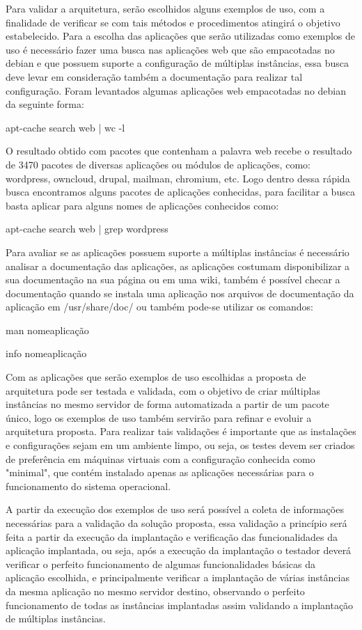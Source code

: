 Para validar a arquitetura, serão escolhidos alguns exemplos de uso, com a
finalidade de verificar se com tais métodos e procedimentos atingirá o objetivo
estabelecido. Para a escolha das aplicações que serão utilizadas como exemplos
de uso é necessário fazer uma busca nas aplicações web que são empacotadas no
debian e que possuem suporte a configuração de múltiplas instâncias, essa busca
deve levar em consideração também a documentação para realizar tal configuração.
Foram levantados algumas aplicações web empacotadas no debian da seguinte forma:

\begin{center}
apt-cache search web | wc -l
\end{center}

O resultado obtido com pacotes que contenham a palavra web recebe o resultado de 3470
pacotes de diversas aplicações ou módulos de aplicações, como:
wordpress, owncloud, drupal, mailman, chromium, etc. Logo dentro dessa rápida busca
encontramos alguns pacotes de aplicações conhecidas, para facilitar a busca basta
aplicar para alguns nomes de aplicações conhecidos como:

\begin{center}
apt-cache search web | grep wordpress
\end{center}

Para avaliar se as aplicações possuem suporte a múltiplas instâncias é necessário
analisar a documentação das aplicações, as aplicações costumam disponibilizar a sua
documentação na sua página ou em uma wiki, também é possível checar a documentação
quando se instala uma aplicação nos arquivos de documentação da aplicação em
/usr/share/doc/ ou também pode-se utilizar os comandos:

\begin{center}
man nomeaplicação

info nomeaplicação
\end{center}

Com as aplicações que serão exemplos de uso escolhidas a proposta de arquitetura
pode ser testada e validada, com o objetivo de criar múltiplas instâncias
no mesmo servidor de forma automatizada a partir de um pacote único, logo os
exemplos de uso também servirão para refinar e evoluir a arquitetura proposta.
Para realizar tais validações é importante que as instalações e configurações
sejam em um ambiente limpo, ou seja, os testes devem ser criados de preferência
em máquinas virtuais com a configuração conhecida como "minimal", que contém
instalado apenas as aplicações necessárias para o funcionamento do sistema operacional.

A partir da execução dos exemplos de uso será possível a coleta de informações
necessárias para a validação da solução proposta, essa validação a princípio
será feita a partir da execução da implantação e verificação das funcionalidades
da aplicação implantada, ou seja, após a execução da implantação o testador deverá
verificar o perfeito funcionamento de algumas funcionalidades básicas da aplicação
escolhida, e principalmente verificar a implantação de várias instâncias da mesma
aplicação no mesmo servidor destino, observando o perfeito funcionamento de todas as
instâncias implantadas assim validando a implantação de múltiplas instâncias.
